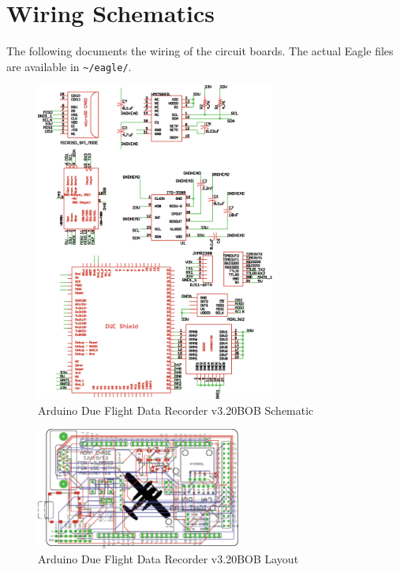 \chapter{Wiring Schematics}
The following documents the wiring of the circuit boards. The actual Eagle files are available in \texttt{\textasciitilde/eagle/}.
\begin{figure}[H]
  \caption{Arduino Due Flight Data Recorder v3.20BOB Schematic} \label{fig:thesisSchematic}
  \centering
    \includegraphics[width=0.7\textwidth]{figures/thesisSchematic.eps}
\end{figure}

\begin{figure}[H]
  \caption{Arduino Due Flight Data Recorder v3.20BOB Layout} \label{fig:thesisBrd}
  \centering
    \includegraphics[width=0.6\textwidth]{figures/thesisBrd.eps}
\end{figure}

